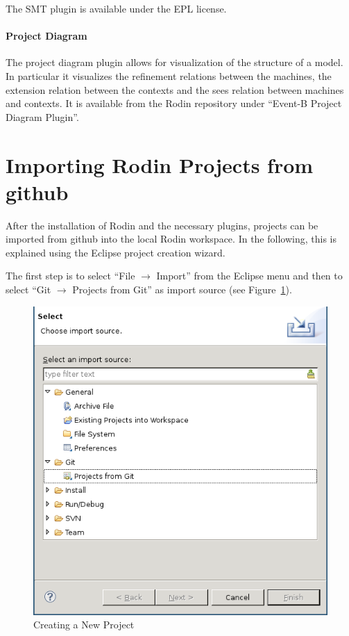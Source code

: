 \documentclass{template/openetcs_article}
\begin{document}
The SMT plugin is available under the EPL license.

\paragraph{Project Diagram}
\label{sec:project-diagram}

The project diagram plugin allows for visualization of the structure of a
model. In particular it visualizes the refinement relations between the
machines, the extension relation between the contexts and the sees relation
between machines and contexts. It is available from the Rodin repository under
``Event-B Project Diagram Plugin''.

\section{Importing Rodin Projects from github}
\label{sec:import-rodin-proj}

After the installation of Rodin and the necessary plugins, projects can be
imported from github into the local Rodin workspace. In the following, this is
explained using the Eclipse project creation wizard.

The first step is to select ``File $\rightarrow$ Import'' from the Eclipse menu
and then to select ``Git $\rightarrow$ Projects from Git'' as import source (see
Figure~\ref{fig:create-new-project}).

\begin{figure}[H]
  \centering
  \includegraphics[width=\skalierung\textwidth]{project_import_step1}
  \caption{Creating a New Project}
  \label{fig:create-new-project}
\end{figure}
\end{document}
